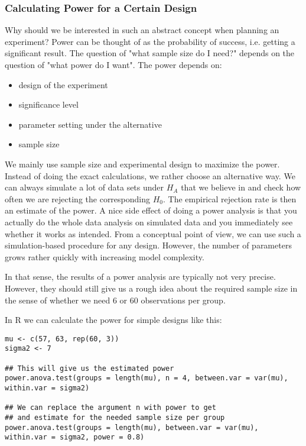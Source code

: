 \subsubsection{Calculating Power for a Certain Design}

Why should we be interested in such an abstract concept when planning an experiment? Power can be thought of as the probability of success, i.e. getting a significant result. The question of "what sample size do I need?" depends on the question of "what power do I want". The power depends on:
\begin{itemize}
	\item design of the experiment
	\item significance level
	\item parameter setting under the alternative
	\item sample size
\end{itemize}

We mainly use sample size and experimental design to maximize the power. Instead of doing the exact calculations, we rather choose an alternative way. We can always simulate a lot of data sets under $H_A$ that we believe in and check how often we are rejecting the corresponding $H_0$. The empirical rejection rate is then an estimate of the power. A nice side effect of doing a power analysis is that you actually do the whole data analysis on simulated data and you immediately see whether it works as intended. From a conceptual point of view, we can use such a simulation-based procedure for any design. However, the number of parameters grows rather quickly with increasing model complexity. \medskip

In that sense, the results of a power analysis are typically not very precise. However, they should still give us a rough idea about the required sample size in the sense of whether we need 6 or 60 observations per group.\medskip

In R we can calculate the power for simple designs like this:
\begin{lstlisting}
mu <- c(57, 63, rep(60, 3)) 
sigma2 <- 7 

## This will give us the estimated power
power.anova.test(groups = length(mu), n = 4, between.var = var(mu), within.var = sigma2)

## We can replace the argument n with power to get 
## and estimate for the needed sample size per group
power.anova.test(groups = length(mu), between.var = var(mu), within.var = sigma2, power = 0.8)
\end{lstlisting}
